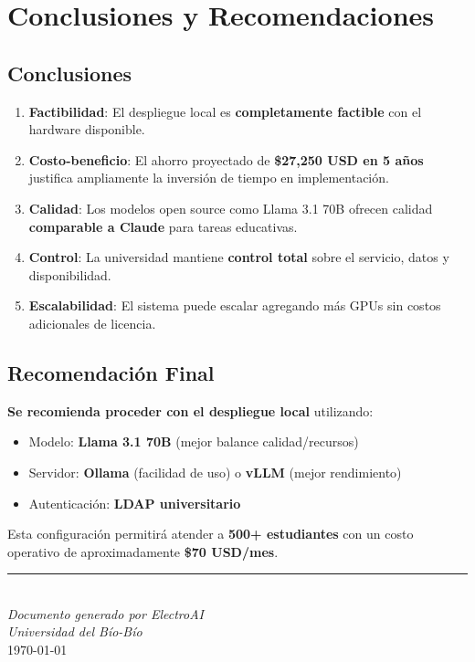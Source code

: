 \documentclass[12pt,letterpaper]{article}
\begin{document}
\section{Conclusiones y Recomendaciones}

\subsection{Conclusiones}

\begin{enumerate}
    \item \textbf{Factibilidad}: El despliegue local es \textbf{completamente factible} con el hardware disponible.

    \item \textbf{Costo-beneficio}: El ahorro proyectado de \textbf{\$27,250 USD en 5 a\~nos} justifica ampliamente la inversi\'on de tiempo en implementaci\'on.

    \item \textbf{Calidad}: Los modelos open source como Llama 3.1 70B ofrecen calidad \textbf{comparable a Claude} para tareas educativas.

    \item \textbf{Control}: La universidad mantiene \textbf{control total} sobre el servicio, datos y disponibilidad.

    \item \textbf{Escalabilidad}: El sistema puede escalar agregando m\'as GPUs sin costos adicionales de licencia.
\end{enumerate}

\subsection{Recomendaci\'on Final}

\begin{tcolorbox}[colback=primary!20, colframe=primary, title=\textbf{Recomendaci\'on}]
\textbf{Se recomienda proceder con el despliegue local} utilizando:
\begin{itemize}
    \item Modelo: \textbf{Llama 3.1 70B} (mejor balance calidad/recursos)
    \item Servidor: \textbf{Ollama} (facilidad de uso) o \textbf{vLLM} (mejor rendimiento)
    \item Autenticaci\'on: \textbf{LDAP universitario}
\end{itemize}

Esta configuraci\'on permitir\'a atender a \textbf{500+ estudiantes} con un costo operativo de aproximadamente \textbf{\$70 USD/mes}.
\end{tcolorbox}

\vspace{1cm}

\begin{center}
\textcolor{primary}{\rule{0.5\linewidth}{1pt}}\\[0.5cm]
\textit{Documento generado por ElectroAI}\\
\textit{Universidad del B\'io-B\'io}\\
\today
\end{center}
\end{document}
